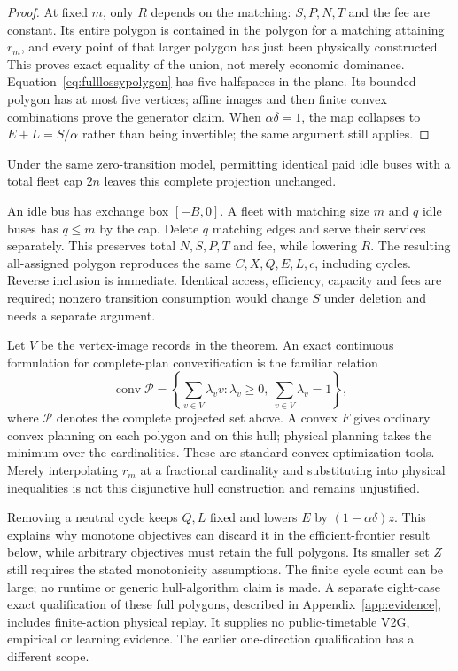 \begin{proof}
At fixed $m$, only $R$ depends on the matching: $S,P,N,T$ and the fee
are constant. Its entire polygon is contained in the polygon for a
matching attaining $r_m$, and every point of that larger polygon has
just been physically constructed. This proves exact equality of the
union, not merely economic dominance. Equation~\eqref{eq:fulllossypolygon}
has five halfspaces in the plane. Its bounded polygon has at most five
vertices; affine images and then finite convex combinations prove the
generator claim. When $\alpha\delta=1$, the map collapses to
$E+L=S/\alpha$ rather than being invertible; the same argument still
applies.
\end{proof}

\begin{corollary}
Under the same zero-transition model, permitting identical paid idle buses
with a total fleet cap $2n$ leaves this complete projection unchanged.
\end{corollary}
An idle bus has exchange box $[-B,0]$. A fleet with matching size $m$ and
$q$ idle buses has $q\le m$ by the cap. Delete $q$ matching edges and
serve their services separately. This preserves total $N,S,P,T$ and fee,
while lowering $R$. The resulting all-assigned polygon reproduces the same
$C,X,Q,E,L,c$, including cycles. Reverse inclusion is immediate. Identical
access, efficiency, capacity and fees are required; nonzero transition
consumption would change $S$ under deletion and needs a separate argument.

Let $V$ be the vertex-image records in the theorem. An exact continuous
formulation for complete-plan convexification is the familiar relation
\[
 \operatorname{conv}\mathcal P
   =\left\{\sum_{v\in V}\lambda_vv:
          \lambda_v\ge0,\ \sum_{v\in V}\lambda_v=1\right\},
\]
where $\mathcal P$ denotes the complete projected set above. A convex
$F$ gives ordinary convex planning on each polygon and on this hull;
physical planning takes the minimum over the cardinalities. These are
standard convex-optimization tools. Merely interpolating $r_m$ at a
fractional cardinality and substituting into physical inequalities is
not this disjunctive hull construction and remains unjustified.

Removing a neutral cycle keeps $Q,L$ fixed and lowers $E$ by
$(1-\alpha\delta)z$. This explains why monotone objectives can discard
it in the efficient-frontier result below, while arbitrary objectives
must retain the full polygons. Its smaller set $Z$ still requires the
stated monotonicity assumptions. The finite cycle count can be large;
no runtime or generic hull-algorithm claim is made. A separate eight-case
exact qualification of these full polygons, described in
Appendix~\ref{app:evidence}, includes finite-action physical replay.
It supplies no public-timetable V2G, empirical or learning evidence.
The earlier one-direction qualification has a different scope.

